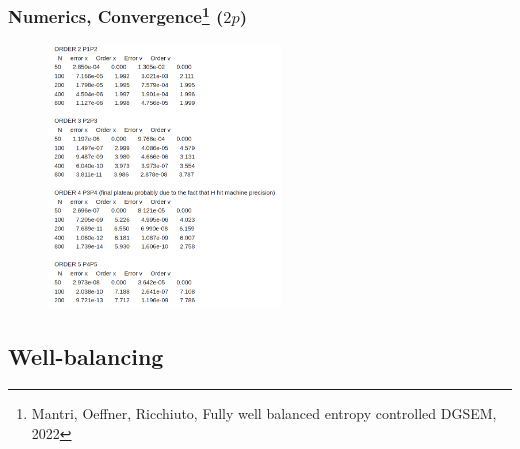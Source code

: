 \documentclass[pt12]{beamer}
\begin{document}
\begin{frame}
\frametitle{Numerics, Convergence\footnote{Mantri, Oeffner, Ricchiuto, Fully well balanced entropy controlled DGSEM, 2022} ($2p$)}



\begin{figure}
     \centering
         \includegraphics[width=0.55\textwidth]{figures/smooth_periodic/conv.png}
\end{figure}


\end{frame}


\subsection{Well-balancing}
\end{document}
